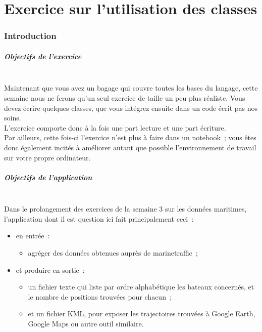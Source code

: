    \hypertarget{exercice-sur-lutilisation-des-classes}{%
\section{Exercice sur l'utilisation des
classes}\label{exercice-sur-lutilisation-des-classes}}

    \hypertarget{introduction}{%
\subsubsection{Introduction}\label{introduction}}

    \hypertarget{objectifs-de-lexercice}{%
\subparagraph{Objectifs de l'exercice\\\\}\label{objectifs-de-lexercice}}

    Maintenant que vous avez un bagage qui couvre toutes les bases du
langage, cette semaine nous ne ferons qu'un seul exercice de taille un
peu plus réaliste. Vous devez écrire quelques classes, que vous intégrez
ensuite dans un code écrit pas nos soins.\\

L'exercice comporte donc à la fois une part lecture et une part
écriture.\\

Par ailleurs, cette fois-ci l'exercice n'est plus à faire dans un
notebook~; vous êtes donc également incités à améliorer autant que
possible l'environnement de travail sur votre propre ordinateur.

    \hypertarget{objectifs-de-lapplication}{%
\subparagraph{Objectifs de
l'application\\\\}\label{objectifs-de-lapplication}}

    Dans le prolongement des exercices de la semaine 3 sur les données
maritimes, l'application dont il est question ici fait principalement
ceci~:

\begin{itemize}
\tightlist
\item
  en entrée~:

  \begin{itemize}
  \tightlist
  \item
    agréger des données obtenues auprès de marinetraffic~;
  \end{itemize}
\item
  et produire en sortie~:

  \begin{itemize}
  \tightlist
  \item
    un fichier texte qui liste par ordre alphabétique les bateaux
    concernés, et le nombre de positions trouvées pour chacun~;
  \item
    et un fichier KML, pour exposer les trajectoires trouvées à Google
    Earth, Google Maps ou autre outil similaire.
  \end{itemize}
\end{itemize}

